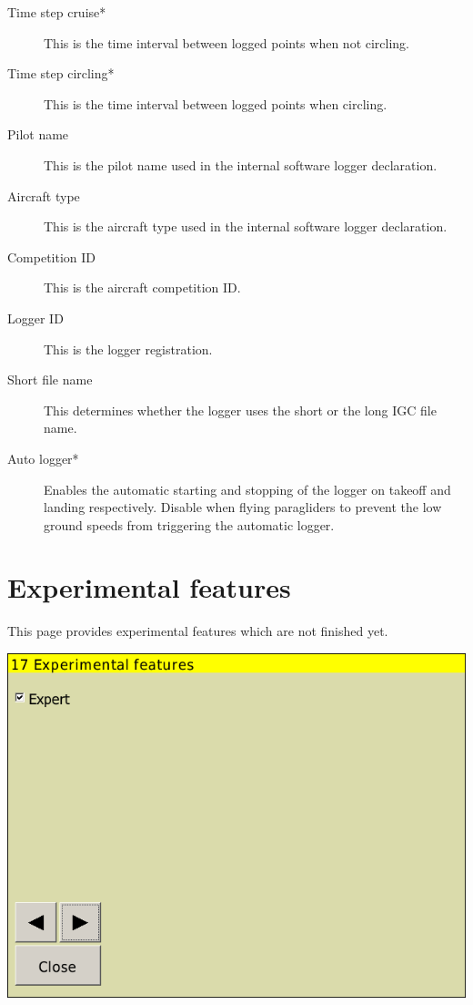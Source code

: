 \documentclass[a4paper,12pt]{refrep}
\begin{document}
\begin{description}
\item[Time step cruise*]  This is the time interval between logged points when not circling. 
\item[Time step circling*]  This is the time interval between logged points when circling. 
\item[Pilot name]  This is the pilot name used in the internal software logger declaration.
\item[Aircraft type]  This is the aircraft type used in the internal software logger declaration.
\item[Competition ID]  This is the aircraft competition ID.
\item[Logger ID]  This is the logger registration.
\item[Short file name]  This determines whether the logger uses the short or the long IGC file name.
\item[Auto logger*]  Enables the automatic starting and stopping of the logger
on takeoff and landing respectively. Disable when flying paragliders to prevent the low ground speeds from
triggering the automatic logger.
\end{description}


\clearpage
\section{Experimental features}

This page provides experimental features which are not finished yet.

\begin{center}
\includegraphics[angle=0,width=0.8\linewidth,keepaspectratio='true']{figures/config-exp.png}
\end{center}
\end{document}
